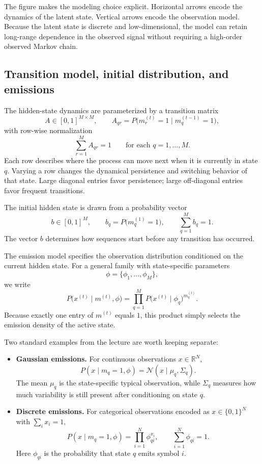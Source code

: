 The figure makes the modeling choice explicit. Horizontal arrows encode the dynamics of the latent state. Vertical arrows encode the observation model. Because the latent state is discrete and low-dimensional, the model can retain long-range dependence in the observed signal without requiring a high-order observed Markov chain.

\subsection{Transition model, initial distribution, and emissions}

The hidden-state dynamics are parameterized by a transition matrix
\[
  A\in[0,1]^{M\times M},
  \qquad
  A_{qr}=P\bigl(m_r^{(t)}=1\mid m_q^{(t-1)}=1\bigr),
\]
with row-wise normalization
\[
  \sum_{r=1}^{M} A_{qr}=1
  \qquad \text{for each } q=1,\dots,M.
\]
Each row describes where the process can move next when it is currently in state $q$. Varying a row changes the dynamical persistence and switching behavior of that state. Large diagonal entries favor persistence; large off-diagonal entries favor frequent transitions.

The initial hidden state is drawn from a probability vector
\[
  b\in[0,1]^M,
  \qquad
  b_q=P\bigl(m_q^{(1)}=1\bigr),
  \qquad
  \sum_{q=1}^{M} b_q=1.
\]
The vector $b$ determines how sequences start before any transition has occurred.

The emission model specifies the observation distribution conditioned on the current hidden state. For a general family with state-specific parameters
\[
  \phi=\{\phi_1,\dots,\phi_M\},
\]
we write
\[
  P\bigl(x^{(t)}\mid m^{(t)},\phi\bigr)
  =
  \prod_{q=1}^{M} P\bigl(x^{(t)}\mid \phi_q\bigr)^{m_q^{(t)}}.
\]
Because exactly one entry of $m^{(t)}$ equals $1$, this product simply selects the emission density of the active state.

Two standard examples from the lecture are worth keeping separate:
\begin{itemize}
  \item \textbf{Gaussian emissions.} For continuous observations $x\in\mathbb{R}^N$,
  \[
    P(x\mid m_q=1,\phi)
    =
    \mathcal{N}(x\mid \mu_q,\Sigma_q).
  \]
  The mean $\mu_q$ is the state-specific typical observation, while $\Sigma_q$ measures how much variability is still present after conditioning on state $q$.
  \item \textbf{Discrete emissions.} For categorical observations encoded as $x\in\{0,1\}^N$ with $\sum_i x_i=1$,
  \[
    P(x\mid m_q=1,\phi)
    =
    \prod_{i=1}^{N}\phi_{qi}^{x_i},
    \qquad
    \sum_{i=1}^{N}\phi_{qi}=1.
  \]
  Here $\phi_{qi}$ is the probability that state $q$ emits symbol $i$.
\end{itemize}

